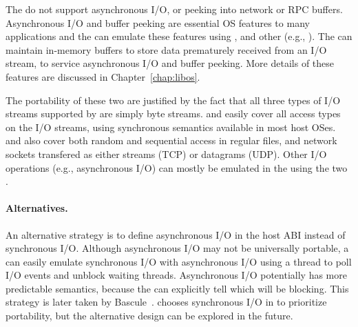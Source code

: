 The \hostapis{} do not support asynchronous I/O, or peeking into network or RPC buffers.
Asynchronous I/O and buffer peeking are
essential OS features to many applications
and the \libos{} can emulate
these features
using , 
and other \hostapis{}
(e.g., ).
The \libos{} can maintain in-memory buffers to store data prematurely received from an I/O stream,
to service asynchronous I/O and buffer peeking.
More details of these features are discussed in Chapter~\ref{chap:libos}.



The portability of these two \hostapis{} are justified
by the fact that
all three types of I/O streams
supported by  are simply byte streams.
 and  easily cover all access types on the I/O streams,
using synchronous semantics available in most host OSes.
 and 
also cover both random and sequential access
in regular files,
and network sockets transfered as either streams (TCP) or datagrams (UDP). 
Other I/O operations (e.g., asynchronous I/O) can mostly be emulated in the \libos{} using the two \hostapis{}.

\paragraph{Alternatives.}
An alternative strategy is to define asynchronous I/O in the host ABI instead of synchronous I/O.
Although asynchronous I/O may not be universally portable,
a \libos{} can easily emulate synchronous I/O with asynchronous I/O using a thread to poll I/O events and unblock waiting threads.
Asynchronous I/O
potentially has more predictable semantics,
because the \libos{} can explicitly tell which \hostapis{} will be blocking.
This strategy
is later taken by Bascule~\cite{baumann13bascule}.
\graphene{} chooses synchronous I/O in \thehostabi{}
to prioritize portability,
but the alternative design can be explored in the future.


